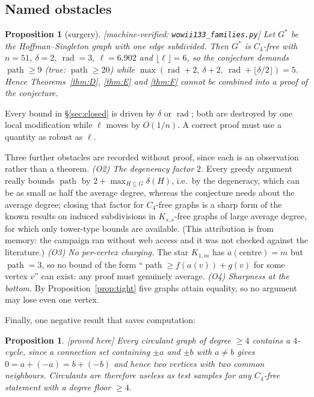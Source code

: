 \documentclass[11pt]{article}
\theoremstyle{plain}
\newtheorem{proposition}[theorem]{Proposition}
\theoremstyle{definition}
\theoremstyle{remark}
\numberwithin{equation}{section}
\newcommand{\rad}{\operatorname{rad}}
\newcommand{\pth}{\operatorname{path}}
\newcommand{\statusbox}[1]{{\small\sloppy\textsf{[#1]}}}
\newcommand{\PRVn}{\statusbox{proved here}}
\newcommand{\MV}[1]{\statusbox{machine-verified: \texttt{#1}}}
\begin{document}
\subsection{Named obstacles}

\begin{proposition}[surgery]\label{prop:o1}
\MV{wowii133\_families.py}
Let $G^\ast$ be the Hoffman--Singleton graph with one edge subdivided. Then $G^\ast$ is
$C_4$-free with $n = 51$, $\delta = 2$, $\rad = 3$, $\ell = 6.902$ and
$\lfloor\ell\rfloor = 6$, so the conjecture demands $\pth \ge 9$ (true: $\pth \ge 20$) while
$\max(\rad+2,\ \delta+2,\ \rad+\lfloor\delta/2\rfloor) = 5$. Hence Theorems~\ref{thm:D},
\ref{thm:E} and \ref{thm:F} cannot be combined into a proof of the conjecture.
\end{proposition}

Every bound in \S\ref{sec:closed} is driven by $\delta$ or $\rad$; both are destroyed by one
local modification while $\ell$ moves by $O(1/n)$. A correct proof must use a quantity as
robust as $\ell$.

Three further obstacles are recorded without proof, since each is an observation rather than
a theorem. \emph{(O2) The degeneracy factor $2$.} Every greedy argument really bounds $\pth$
by $2 + \max_{H\subseteq G}\delta(H)$, i.e.\ by the degeneracy, which can be as small as half
the average degree, whereas the conjecture needs about the average degree; closing that
factor for $C_4$-free graphs is a sharp form of the known results on induced subdivisions in
$K_{s,s}$-free graphs of large average degree, for which only tower-type bounds are
available. (This attribution is from memory: the campaign ran without web access and it was
not checked against the literature.) \emph{(O3) No per-vertex charging.} The star $K_{1,m}$
has $a(\text{centre}) = m$ but $\pth = 3$, so no bound of the form
``$\pth \ge f(a(v)) + g(v)$ for some vertex $v$'' can exist: any proof must genuinely
average. \emph{(O4) Sharpness at the bottom.} By Proposition~\ref{prop:tight} five graphs
attain equality, so no argument may lose even one vertex.

Finally, one negative result that saves computation:

\begin{proposition}\label{prop:circulant}
\PRVn
Every circulant graph of degree $\ge 4$ contains a $4$-cycle, since a connection set
containing $\pm a$ and $\pm b$ with $a \ne b$ gives $0 = a + (-a) = b + (-b)$ and hence two
vertices with two common neighbours. Circulants are therefore useless as test samples for any
$C_4$-free statement with a degree floor $\ge 4$.
\end{proposition}
\end{document}
